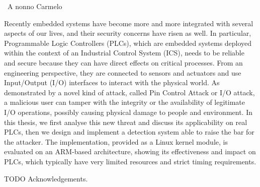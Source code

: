 \documentclass[pdfa,cucitura]{toptesi}
\begin{document}

\TesiDiLaurea{}










\frontespizio
\paginavuota
\newpage

\advance\voffset -5mm
\advance\textheight 30mm


\begin{dedica}
\textdagger\ A nonno Carmelo
\end{dedica}


\sommario

Recently embedded systems have become more and more integrated with several aspects of our lives, and their security concerns have risen as well.
In particular, Programmable Logic Controllers (PLCs), which are embedded systems deployed within the context of an Industrial Control System (ICS),
needs to be reliable and secure because they can have direct effects on critical processes.
From an engineering perspective, they are connected to sensors and actuators and use Input/Output (I/O) interfaces to interact with the physical world.
As demonstrated by a novel kind of attack, called Pin Control Attack or I/O attack, a malicious user can tamper with the integrity or
the availability of legitimate I/O operations, possibly causing physical damage to people and environment.
In this thesis, we first analyse this new threat and discuss its applicability on real PLCs, then we design and implement a detection system able to raise the bar for the attacker.
The implementation, provided as a Linux kernel module, is evaluated on an ARM-based architecture,
showing its effectiveness and impact on PLCs, which typically have very limited resources and strict timing requirements.


\ringraziamenti

TODO Acknowledgements.


\end{document}
